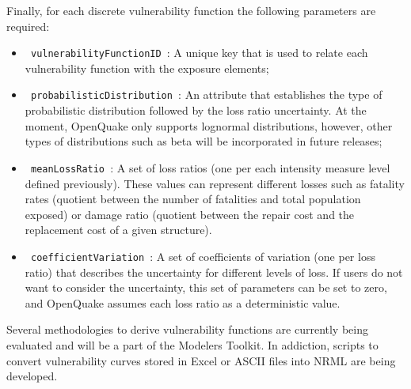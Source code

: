 Finally, for each discrete vulnerability function the following parameters are required:
\begin{itemize}
\item  \Verb+ vulnerabilityFunctionID +: A unique key that is used to relate each vulnerability function with the exposure elements;
\item  \Verb+ probabilisticDistribution +: An attribute that establishes the type of probabilistic distribution followed by the loss ratio uncertainty. At the moment, OpenQuake only supports lognormal distributions, however, other types of distributions such as beta will be incorporated in future releases;
\item  \Verb+ meanLossRatio +: A set of loss ratios (one per each intensity measure level defined previously). These values can represent different losses such as fatality rates (quotient between the number of fatalities and total population exposed) or damage ratio (quotient between the repair cost and the replacement cost of a given structure).
\item  \Verb+ coefficientVariation +: A set of coefficients of variation (one per loss ratio) that describes the uncertainty for different levels of loss. If users do not want to consider the uncertainty, this set of parameters can be set to zero, and OpenQuake assumes each loss ratio as a deterministic value. 
\end{itemize}


Several methodologies to derive vulnerability functions are currently being evaluated and will be a part of the Modelers Toolkit. In addiction, scripts to convert vulnerability curves stored in Excel or ASCII files into NRML are being developed.
